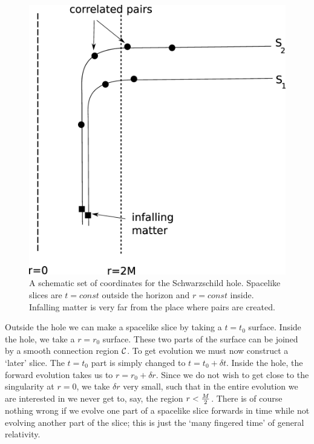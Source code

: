 \documentclass[11pt]{article}
\begin{document}
 \begin{figure}[htbp]
\begin{center}
\includegraphics[scale=.18]{ftwo.eps}
\caption{{A schematic set of coordinates for the Schwarzschild hole. Spacelike slices are $t=const$ outside the horizon and $r=const$ inside. Infalling matter is very far from the place where pairs are created.}}
\label{ftwo}
\end{center}
\end{figure}


Outside the hole we can make a spacelike slice by taking a $t=t_0$ surface. Inside the hole, we take a $r=r_0$ surface. These two parts of the surface can be joined by a smooth connection region ${\cal C}$.
To get evolution we must now construct a `later' slice. The $t=t_0$ part is simply changed to $t=t_0+\delta t$. Inside the hole, the forward evolution takes us to $r=r_0+\delta r$. Since we do not wish to get close to the singularity at $r=0$, we take $\delta r$ very small, such that in the entire evolution we are interested in we never get to, say, the region $r<{M\over 2}$. There is of course nothing wrong if we evolve one part of a spacelike slice forwards in time while not evolving another part of the slice; this is just the `many fingered time' of general relativity.
\end{document}
